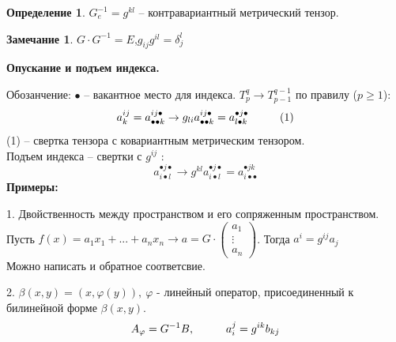 \documentclass[a4paper, 12pt]{article}
\newcommand\tab[1][.5cm]{\hspace*{#1}}
\theoremstyle{definition}
\newtheorem*{definition}{Определение}
\newtheorem*{remark}{Замечание}
\begin{document}
    \begin{definition}
        $G_e^{-1} = g^{kl}$ -- контравариантный метрический тензор.
    \end{definition}
    \begin{remark}
        $G\cdot G^{-1} = E$,\tab[1cm]$g_{ij}g^{il} = \delta_j^l$  
    \end{remark}
    \begin{center}
        \textbf{Опускание и подъем индекса.} 
    \end{center}
    Обозанчение: $\bullet$ -- вакантное место для индекса.
    $T_p^q \to T_{p-1}^{q-1}$ по правилу ($p \geq 1$):
    $$a_k^{ij} = a_{\bullet \bullet k}^{ij \bullet } \to g_{li}a_{\bullet\bullet k}^{ij\bullet} = a_{l\bullet k}^{\bullet j\bullet}\tab[1cm]\text{(1)}$$
    (1) -- свертка тензора с ковариантным метрическим тензором.\\
    Подъем индекса -- свертки с $g^{ij}$ :
    $$a_{i\bullet l}^{\bullet j\bullet} \to g^{kl}a_{i\bullet l}^{\bullet j \bullet} = a_{i\bullet \bullet}^{\bullet jk}$$
    \textbf{Примеры:}
    
    1. Двойственность между пространством и его сопряженным пространством. Пусть $f(x) = a_1x_1 + ... + a_nx_n \longrightarrow a = G\cdot \begin{pmatrix}
        a_1\\\vdots\\a_n
    \end{pmatrix}$. Тогда $a^i = g^{ij}a_j$\\
    Можно написать и обратное соответсвие.
    
    2. $\beta(x,y) = (x, \varphi(y)),\ \varphi$ - линейный оператор, присоединенный к билинейной форме $\beta(x,y)$.
    $$A_\varphi = G^{-1}B,\tab[1cm]a_i^j = g^{ik}b_{kj}$$  
\end{document}
